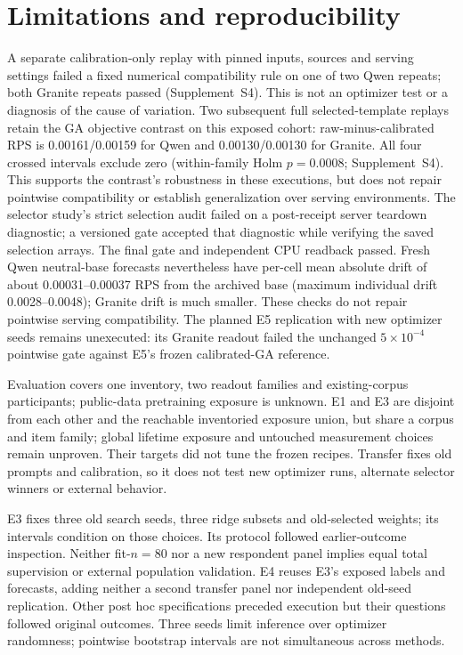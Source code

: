 \documentclass[10pt,twocolumn]{article}
\newcommand{\ArchivalApp}{Supplement~S4}
\begin{document}
\section{Limitations and reproducibility}
A separate calibration-only replay with pinned inputs, sources and serving
settings failed a fixed numerical compatibility rule on one of two Qwen
repeats; both Granite repeats passed (\ArchivalApp).
This is not an optimizer test or a diagnosis of the cause of variation.
Two subsequent full selected-template replays retain the GA objective contrast
on this exposed cohort: raw-minus-calibrated RPS is 0.00161/0.00159 for Qwen
and 0.00130/0.00130 for Granite. All four crossed intervals exclude zero
(within-family Holm $p=0.0008$; \ArchivalApp). This supports the
contrast's robustness in these executions, but does not repair pointwise
compatibility or establish generalization over serving environments.
The selector study's strict selection audit failed on a post-receipt
server teardown diagnostic; a versioned gate accepted that diagnostic while
verifying the saved selection arrays. The final gate and independent CPU
readback passed. Fresh Qwen neutral-base forecasts nevertheless have per-cell
mean absolute drift of about 0.00031--0.00037 RPS from the archived base
(maximum individual drift 0.0028--0.0048); Granite drift is much smaller.
These checks do not repair pointwise serving compatibility.
The planned E5 replication with new optimizer seeds remains unexecuted:
its Granite readout failed the unchanged $5\times10^{-4}$ pointwise gate
against E5's frozen calibrated-GA reference.

Evaluation covers one inventory, two readout families and existing-corpus
participants; public-data pretraining exposure is unknown. E1 and E3 are disjoint from each other and
the reachable inventoried exposure union, but share a corpus and item family;
global lifetime exposure and untouched measurement choices remain unproven.
Their targets did not tune the frozen recipes. Transfer fixes old prompts and
calibration, so it does not test new optimizer runs, alternate selector
winners or external behavior.

E3 fixes three old search seeds, three ridge subsets and old-selected weights;
its intervals condition on those choices. Its protocol followed earlier-outcome inspection. Neither fit-$n=80$ nor a new respondent panel
implies equal total supervision or external population validation. E4 reuses
E3's exposed labels and forecasts, adding neither a second transfer panel nor
independent old-seed replication. Other post hoc specifications preceded
execution but their questions followed original outcomes. Three seeds limit
inference over optimizer randomness; pointwise bootstrap intervals are not
simultaneous across methods.
\end{document}
